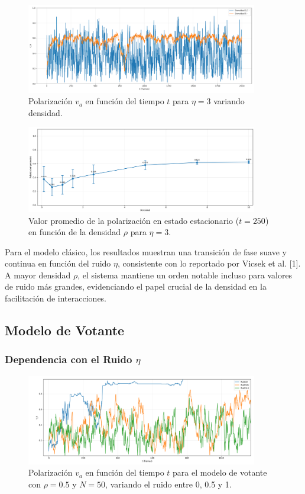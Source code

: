 \documentclass{article}
\begin{document}
\begin{figure}[H]
\centering
\includegraphics[width=0.9\textwidth]{19.png}
\caption{Polarización $v_a$ en función del tiempo $t$ para $\eta = 3$ variando densidad.}
\label{fig:19}
\end{figure}

\begin{figure}[H]
\centering
\includegraphics[width=0.9\textwidth]{20.png}
\caption{Valor promedio de la polarización en estado estacionario ($t = 250$) en función de la densidad $\rho$ para $\eta = 3$.}
\label{fig:20}
\end{figure}

Para el modelo clásico, los resultados muestran una transición de fase suave y continua en función del ruido $\eta$, consistente con lo reportado por Vicsek et al. [1]. A mayor densidad $\rho$, el sistema mantiene un orden notable incluso para valores de ruido más grandes, evidenciando el papel crucial de la densidad en la facilitación de interacciones.

\subsection{Modelo de Votante}
\subsubsection{Dependencia con el Ruido $\eta$}
\begin{figure}[H]
\centering
\includegraphics[width=0.9\textwidth]{Voter Densidad 0.5 Variando ruido.png}
\caption{Polarización $v_a$ en función del tiempo $t$ para el modelo de votante con $\rho = 0.5$ y $N = 50$, variando el ruido entre 0, 0.5 y 1.}
\label{fig:va_vs_eta_voter}
\end{figure}
\end{document}
